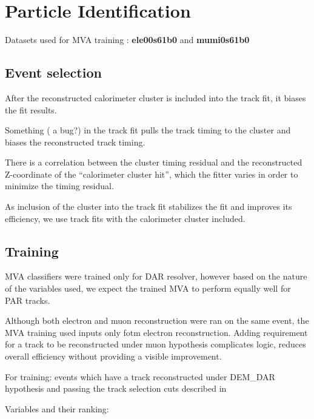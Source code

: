 

\section{Particle Identification}

Datasets used for MVA training : {\bf ele00s61b0} and {\bf mumi0s61b0}


\subsection {Event selection}

After the reconstructed calorimeter cluster is included into the track fit, it biases the fit results.

Something ( a bug?) in the track fit pulls the track timing to the cluster and biases
the reconstructed track timing.

There  is a correlation between the cluster timing residual and the reconstructed Z-coordinate of the
``calorimeter cluster hit'', which the fitter varies in order to minimize the timing residual.

As inclusion of the cluster into the track fit stabilizes the fit and improves its efficiency,
we use track fits with the calorimeter cluster included.

\subsection {Training}

MVA classifiers were trained only for DAR resolver, however based on the nature of 
the variables used, we expect the trained MVA to perform equally well for PAR tracks.

Although both electron and muon reconstruction were ran on the same event, the MVA training used inputs 
only fotm electron reconstruction. Adding requirement for a track to be reconstructed under muon hypothesis 
complicates logic, reduces overall efficiency without providing a visible improvement.

For training: events which have a track reconstructed under DEM\_DAR hypothesis and passing the track 
selection cuts described in 

Variables and their ranking:

